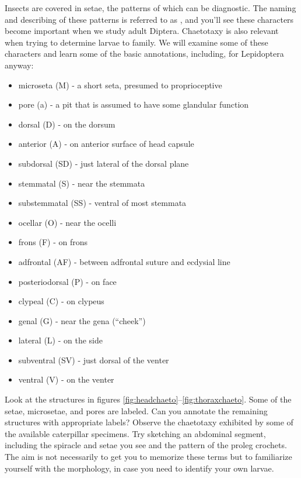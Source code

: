 Insects are covered in setae, the patterns of which can be diagnostic. The naming and describing of these patterns is referred to as , and you'll see these characters become important when we study adult Diptera. Chaetotaxy is also relevant when trying to determine larvae to family. We will examine some of these characters and learn some of the basic annotations, including, for Lepidoptera anyway:
\begin{itemize}
    \item microseta (M) - a short seta, presumed to proprioceptive
    \item pore (a) - a pit that is assumed to have some glandular function
    \item dorsal (D) - on the dorsum
    \item anterior (A) - on anterior surface of head capsule
    \item subdorsal (SD) - just lateral of the dorsal plane
    \item stemmatal (S) - near the stemmata
    \item substemmatal (SS) - ventral of most stemmata
    \item ocellar (O) - near the ocelli
    \item frons (F) - on frons
    \item adfrontal (AF) - between adfrontal suture and ecdysial line
    \item posteriodorsal (P) - on face
    \item clypeal (C) - on clypeus
    \item genal (G) - near the gena (``cheek'')
    \item lateral (L) - on the side
    \item subventral (SV) - just dorsal of the venter
    \item ventral (V) - on the venter
\end{itemize}\vfill

\begin{theo}
{}Look at the structures in figures \ref{fig:headchaeto}--\ref{fig:thoraxchaeto}. Some of the setae, microsetae, and pores are labeled. Can you annotate the remaining structures with appropriate labels? Observe the chaetotaxy exhibited by some of the available caterpillar specimens. Try sketching an abdominal segment, including the spiracle and setae you see and the pattern of the proleg crochets. The aim is not necessarily to get you to memorize these terms but to familiarize yourself with the morphology, in case you need to identify your own larvae.
\end{theo}

